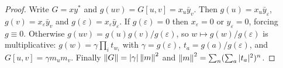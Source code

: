 \begin{proof}
Write $G=xy^*$ and $g(uv)=G[u,v]=x_u\bar y_v$. Then $g(u)=x_u\bar y_\varepsilon$,
$g(v)=x_\varepsilon\bar y_v$ and $g(\varepsilon)=x_\varepsilon\bar y_\varepsilon$. If
$g(\varepsilon)=0$ then $x_\varepsilon=0$ or $y_\varepsilon=0$, forcing $g\equiv0$.
Otherwise $g(uv)=g(u)g(v)/g(\varepsilon)$, so $w\mapsto g(w)/g(\varepsilon)$ is
multiplicative: $g(w)=\gamma\prod_it_{w_i}$ with $\gamma=g(\varepsilon)$,
$t_a=g(a)/g(\varepsilon)$, and $G[u,v]=\gamma m_um_v$. Finally
$\left\lVert G\right\rVert=|\gamma|\left\lVert m\right\rVert^2$ and $\left\lVert m\right\rVert^2=\sum_n(\sum_a|t_a|^2)^n$.
\end{proof}
